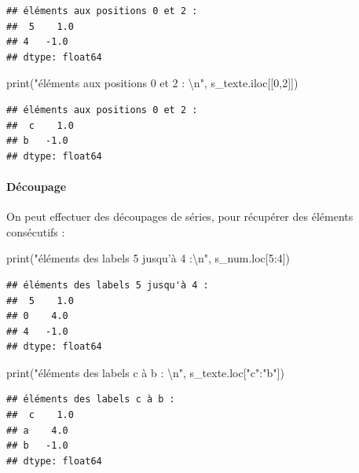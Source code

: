 \documentclass[12pt,]{book}
\newenvironment{Shaded}{\begin{snugshade}}{\end{snugshade}}
\newcommand{\DecValTok}[1]{\textcolor[rgb]{0.00,0.00,0.81}{#1}}
\newcommand{\CharTok}[1]{\textcolor[rgb]{0.31,0.60,0.02}{#1}}
\newcommand{\StringTok}[1]{\textcolor[rgb]{0.31,0.60,0.02}{#1}}
\newcommand{\BuiltInTok}[1]{#1}
\newcommand{\NormalTok}[1]{#1}
\let\oldparagraph\paragraph
\renewcommand{\paragraph}[1]{\oldparagraph{#1}\mbox{}}
\numberwithin{equation}{section}
\numberwithin{countremarque}{section}
\begin{document}
\begin{lstlisting}
## éléments aux positions 0 et 2 :
##  5    1.0
## 4   -1.0
## dtype: float64
\end{lstlisting}

\begin{Shaded}
\begin{Highlighting}[]
\BuiltInTok{print}\NormalTok{(}\StringTok{"éléments aux positions 0 et 2 : }\CharTok{\textbackslash{}n}\StringTok{"}\NormalTok{, s_texte.iloc[[}\DecValTok{0}\NormalTok{,}\DecValTok{2}\NormalTok{]])}
\end{Highlighting}
\end{Shaded}

\begin{lstlisting}
## éléments aux positions 0 et 2 : 
##  c    1.0
## b   -1.0
## dtype: float64
\end{lstlisting}

\paragraph{Découpage}\label{decoupage-series}

On peut effectuer des découpages de séries, pour récupérer des éléments
consécutifs :

\begin{Shaded}
\begin{Highlighting}[]
\BuiltInTok{print}\NormalTok{(}\StringTok{"éléments des labels 5 jusqu'à 4 :}\CharTok{\textbackslash{}n}\StringTok{"}\NormalTok{, s_num.loc[}\DecValTok{5}\NormalTok{:}\DecValTok{4}\NormalTok{])}
\end{Highlighting}
\end{Shaded}

\begin{lstlisting}
## éléments des labels 5 jusqu'à 4 :
##  5    1.0
## 0    4.0
## 4   -1.0
## dtype: float64
\end{lstlisting}

\begin{Shaded}
\begin{Highlighting}[]
\BuiltInTok{print}\NormalTok{(}\StringTok{"éléments des labels c à b : }\CharTok{\textbackslash{}n}\StringTok{"}\NormalTok{, s_texte.loc[}\StringTok{"c"}\NormalTok{:}\StringTok{"b"}\NormalTok{])}
\end{Highlighting}
\end{Shaded}

\begin{lstlisting}
## éléments des labels c à b : 
##  c    1.0
## a    4.0
## b   -1.0
## dtype: float64
\end{lstlisting}
\end{document}
